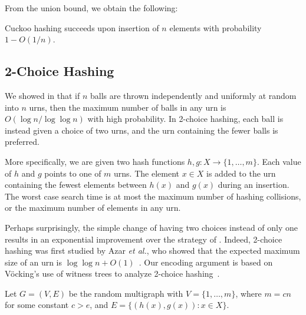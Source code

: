 \documentclass{patmorin}
\begin{document}
From the union bound, we obtain the following:
\begin{cor}
  Cuckoo hashing succeeds upon insertion of $n$ elements with
  probability $1 - O(1/n)$.
\end{cor}

\subsection{2-Choice Hashing}

We showed in  that if $n$ balls are thrown independently
and uniformly at random into $n$ urns, then the maximum number of
balls in any urn is $O(\log n/\log \log n)$ with high probability. In
2-choice hashing, each ball is instead given a choice of two urns, and
the urn containing the fewer balls is preferred.

More specifically, we are given two hash functions
$h, g : X \to \{1, \ldots, m\}$. Each value of $h$ and $g$ points to
one of $m$ urns. The element $x \in X$ is added to the urn containing
the fewest elements between $h(x)$ and $g(x)$ during an insertion. The
worst case search time is at most the maximum number of hashing
collisions, or the maximum number of elements in any urn.

Perhaps surprisingly, the simple change of having two choices instead
of only one results in an exponential improvement over the strategy of
. Indeed, 2-choice hashing was first studied by Azar
\emph{et al.}, who showed that the expected maximum size of an urn is
$\log \log n + O(1)$~\cite{azar:multiplechoice}. Our encoding argument
is based on V\"{o}cking's use of witness trees to analyze 2-choice
hashing~\cite{vocking:witness}.

Let $G = (V, E)$ be the random multigraph with $V = \{1, \ldots, m\}$,
where $m = cn$ for some constant $c > e$, and
$E = \{(h(x), g(x)) : x \in X\}$.
\end{document}
